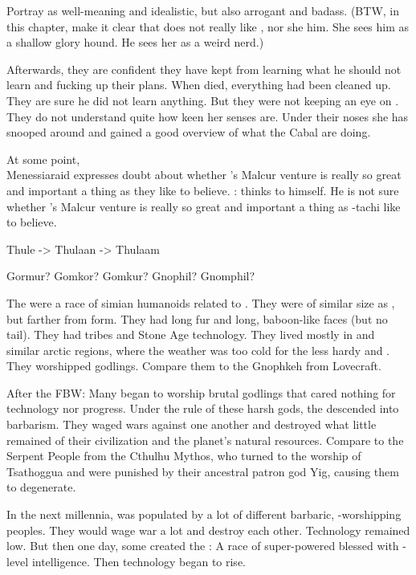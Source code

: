   Portray \Teshrial as well-meaning and idealistic, but also arrogant and badass. 
  (BTW, in this chapter, make it clear that \Teshrial does not really like \Urizeth, nor she him.
  She sees him as a shallow glory hound.
  He sees her as a weird nerd.)
  
  Afterwards, they are confident they have kept \Ishnaruchaefir from learning what he should not learn and fucking up their plans. 
  When \Teshrial died, everything had been cleaned up.
  They are sure he did not learn anything.
  But they were not keeping an eye on \Criseis.
  They do not understand quite how keen her senses are.
  Under their noses she has snooped around and gained a good overview of what the Cabal are doing. 

At some point, \\Menessiaraid expresses doubt about whether \Teshrial's Malcur venture is really so great and important a thing as they like to believe. 
\Azraid:
  \Azraid thinks to himself. 
  He is not sure whether \Teshrial's Malcur venture is really so great and important a thing as \Teshrial-tachi like to believe. 


Thule -> Thulaan -> Thulaam


Gormur? Gomkor? Gomkur? Gnophil? Gnomphil?

The \gormurim were a race of simian humanoids related to \nephilim.
They were of similar size as \nephilim, but farther from \human form.
They had long fur and long, baboon-like faces (but no tail).
They had tribes and Stone Age technology.
They lived mostly in \Thulaan and similar arctic regions, where the weather was too cold for the less hardy \humans and \scathae.
They worshipped \xss godlings. 
Compare them to the Gnophkeh from Lovecraft. 



After the FBW:
Many \ophidians began to worship brutal \xs godlings that cared nothing for technology nor progress. 
Under the rule of these harsh gods, the \ophidians descended into barbarism.
They waged wars against one another and destroyed what little remained of their civilization and the planet's natural resources.
Compare to the Serpent People from the Cthulhu Mythos, who turned to the worship of Tsathoggua and were punished by their ancestral patron god Yig, causing them to degenerate. 

In the next millennia, \Miith was populated by a lot of different barbaric, \xs-worshipping peoples. 
They would wage war a lot and destroy each other.
Technology remained low.
But then one day, some \quiljaaran created the \aryothim: A race of super-powered \nephilim blessed with \quiljaar-level intelligence.
Then technology began to rise. 



